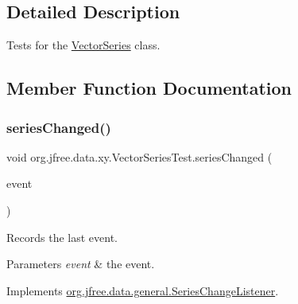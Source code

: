 \subsection{Detailed Description}
Tests for the \mbox{\hyperlink{classorg_1_1jfree_1_1data_1_1xy_1_1_vector_series}{Vector\+Series}} class. 

\subsection{Member Function Documentation}
\mbox{\label{classorg_1_1jfree_1_1data_1_1xy_1_1_vector_series_test_ab049ec8170566cf3bfe34c6ff1b47eed}} 
\subsubsection{\texorpdfstring{series\+Changed()}{seriesChanged()}}
{\footnotesize\ttfamily void org.\+jfree.\+data.\+xy.\+Vector\+Series\+Test.\+series\+Changed (\begin{DoxyParamCaption}\item[{\mbox{\hyperlink{classorg_1_1jfree_1_1data_1_1general_1_1_series_change_event}{Series\+Change\+Event}}}]{event }\end{DoxyParamCaption})}

Records the last event.


\begin{DoxyParams}{Parameters}
{\em event} & the event. \\
\hline
\end{DoxyParams}


Implements \mbox{\hyperlink{interfaceorg_1_1jfree_1_1data_1_1general_1_1_series_change_listener_a441fd65d1290b91e0184124be928ebf7}{org.\+jfree.\+data.\+general.\+Series\+Change\+Listener}}.

\mbox{\label{classorg_1_1jfree_1_1data_1_1xy_1_1_vector_series_test_a0b3647f0b927f774f406a93d5ffa56fa}} 
